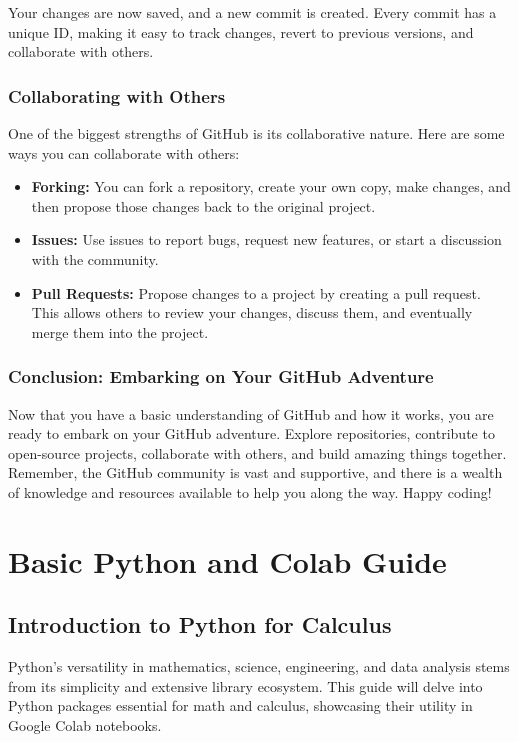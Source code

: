 \documentclass[a4paper,12pt]{book}
\begin{document}
Your changes are now saved, and a new commit is created. Every commit has a unique ID, making it easy to track changes, revert to previous versions, and collaborate with others.

\subsection*{Collaborating with Others}

One of the biggest strengths of GitHub is its collaborative nature. Here are some ways you can collaborate with others:

\begin{itemize}
    \item \textbf{Forking:} You can fork a repository, create your own copy, make changes, and then propose those changes back to the original project.
    \item \textbf{Issues:} Use issues to report bugs, request new features, or start a discussion with the community.
    \item \textbf{Pull Requests:} Propose changes to a project by creating a pull request. This allows others to review your changes, discuss them, and eventually merge them into the project.
\end{itemize}

\subsection*{Conclusion: Embarking on Your GitHub Adventure}

Now that you have a basic understanding of GitHub and how it works, you are ready to embark on your GitHub adventure. Explore repositories, contribute to open-source projects, collaborate with others, and build amazing things together. Remember, the GitHub community is vast and supportive, and there is a wealth of knowledge and resources available to help you along the way. Happy coding!


\chapter{Basic Python and Colab Guide}
\section*{Introduction to Python for Calculus}

Python's versatility in mathematics, science, engineering, and data analysis stems from its simplicity and extensive library ecosystem. This guide will delve into Python packages essential for math and calculus, showcasing their utility in Google Colab notebooks.
\end{document}
